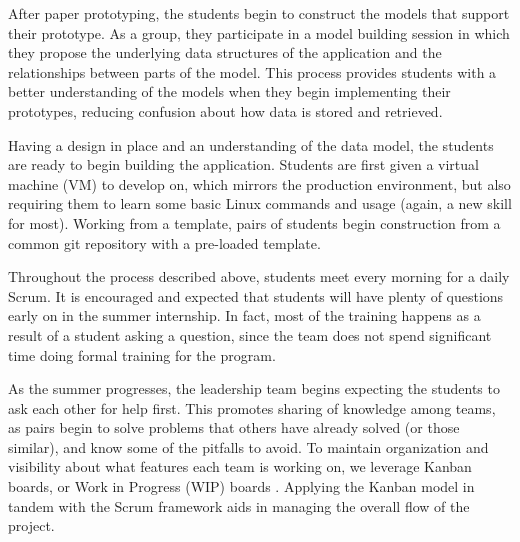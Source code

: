 After paper prototyping, the students begin to construct the models that support their prototype. As a group, they participate in a model building session in which they propose the underlying data structures of the application and the relationships between parts of the model. This process provides students with a better understanding of the models when they begin implementing their prototypes, reducing confusion about how data is stored and retrieved.

Having a design in place and an understanding of the data model, the students are ready to begin building the application. Students are first given a virtual machine (VM) to develop on, which mirrors the production environment, but also requiring them to learn some basic Linux commands and usage (again, a new skill for most). Working from a template, pairs of students begin construction from a common git repository with a pre-loaded template.

Throughout the process described above, students meet every morning for a daily Scrum. It is encouraged and expected that students will have plenty of questions early on in the summer internship. In fact, most of the training happens as a result of a student asking a question, since the team does not spend significant time doing formal training for the program.

As the summer progresses, the leadership team begins expecting the students to ask each other for help first. This promotes sharing of knowledge among teams, as pairs begin to solve problems that others have already solved (or those similar), and know some of the pitfalls to avoid. To maintain organization and visibility about what features each team is working on, we leverage Kanban boards, or Work in Progress (WIP) boards \cite{anderson2010kanban}. Applying the Kanban model in tandem with the Scrum framework aids in managing the overall flow of the project.




